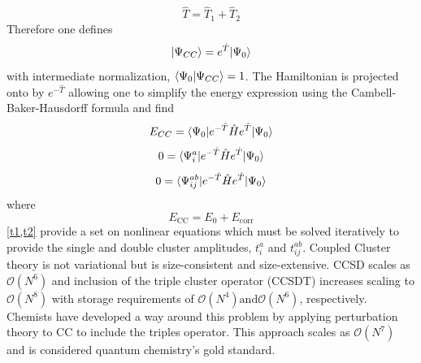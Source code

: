         \begin{equation}
          \hat{T} = \hat{T}_1 + \hat{T}_2
        \end{equation}
      Therefore one defines
        \begin{equation}\label{CC_wfn}
          | \Psi_{CC} \rangle = e^{\hat{T}}| \Psi_0 \rangle
        \end{equation}
      with intermediate normalization, $\langle\Psi_0|\Psi_{CC}\rangle = 1$. 
      The Hamiltonian is projected onto by $e^{-\hat{T}}$ allowing one to simplify the energy expression using the Cambell-Baker-Hausdorff formula\cite{Crawford2000} and find%
        \begin{equation}\label{E_cc}
            E_{CC} = \langle\Psi_0 |e^{-\hat{T}} \hat{H} e^{\hat{T}} | \Psi_0 \rangle
        \end{equation}
        \begin{equation}\label{t1}
          0 = \langle\Psi^a_i | e^{-\hat{T}} \hat{H} e^{\hat{T}} | \Psi_0 \rangle
        \end{equation}
        \begin{equation}\label{t2}
          0 = \langle\Psi^{ab}_{ij} | e^{-\hat{T}} \hat{H} e^{\hat{T}} | \Psi_0 \rangle
        \end{equation}
      where 
        \begin{equation}
          E_{\text{CC}} = E_0 + E_{\text{corr}}
        \end{equation}
      \cref{t1,t2} provide a set on nonlinear equations which must be solved iteratively to provide the single and double cluster amplitudes, $t^a_i$ and $t^{ab}_{ij}$.
      Coupled Cluster theory is not variational but is size-consistent and size-extensive. 
      CCSD scales as $\mathcal{O}(N^6)$ and inclusion of the triple cluster operator (CCSDT) increases scaling to $\mathcal{O}(N^8)$\cite{Noga1987,Scuseria1988} with storage requirements of $\mathcal{O}(N^4) \text {and} \mathcal{O}(N^6)$, respectively. Chemists have developed a way around this problem by applying perturbation theory to CC to include the triples operator\cite{Crawford2000}. 
      This approach scales as $\mathcal{O}(N^7)$ and is considered quantum chemistry's gold standard.
